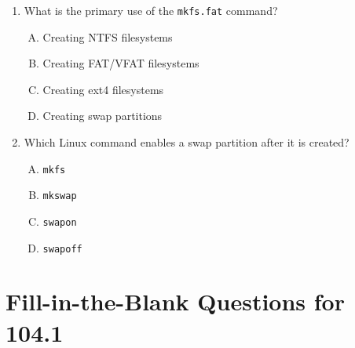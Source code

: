 \documentclass[a4paper]{report}
\begin{document}
\begin{enumerate}[1.]
    \item What is the primary use of the \texttt{mkfs.fat} command?  
    \begin{enumerate}[A)]
        \item Creating NTFS filesystems  
        \item Creating FAT/VFAT filesystems  
        \item Creating ext4 filesystems  
        \item Creating swap partitions  
    \end{enumerate}

    \item Which Linux command enables a swap partition after it is created?  
    \begin{enumerate}[A)]
        \item \texttt{mkfs}  
        \item \texttt{mkswap}  
        \item \texttt{swapon}  
        \item \texttt{swapoff}  
    \end{enumerate}

\end{enumerate}

\newpage
\section*{Fill-in-the-Blank Questions for 104.1}
\end{document}
